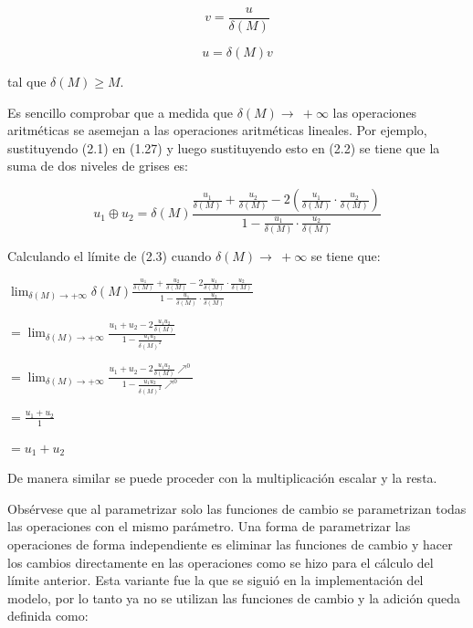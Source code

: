 \begin{equation}
	v=\frac{u}{\delta(M)}
\end{equation}

\begin{equation}
	u=\delta(M)v
\end{equation}

tal que $\delta(M) \geq M$.

Es sencillo comprobar que a medida que $\delta(M)\to\ +\infty$ las operaciones aritm\'eticas se asemejan a las operaciones aritm\'eticas lineales. Por ejemplo, sustituyendo (2.1) en (1.27) y luego sustituyendo esto en (2.2) se tiene que la suma de dos niveles de grises es:

\begin{equation}
	u_1\oplus u_2=\delta(M)\frac{\frac{u_1}{\delta(M)}+\frac{u_2}{\delta(M)}-2\left(\frac{u_1}{\delta(M)}\cdot\frac{u_2}{\delta(M)}\right)}{1-\frac{u_1}{\delta(M)}\cdot\frac{u_2}{\delta(M)}}
\end{equation}

Calculando el l\'imite de (2.3) cuando $\delta(M)\to\ +\infty$ se tiene que:

\begin{center}
	$\displaystyle\lim_{\delta(M) \to +\infty}\delta(M)\frac{\frac{u_1}{\delta(M)}+\frac{u_2}{\delta(M)}-2\frac{u_1}{\delta(M)}\cdot\frac{u_2}{\delta(M)}}{1-\frac{u_1}{\delta(M)}\cdot\frac{u_2}{\delta(M)}}$
	
	$\displaystyle=\lim_{\delta(M) \to +\infty}\frac{u_1+u_2-2\frac{u_1u_2}{\delta(M)}}{1-\frac{u_1u_2}{\delta(M)^2}}$
	
	$\displaystyle=\lim_{\delta(M) \to +\infty}\frac{u_1+u_2-2\frac{u_1u_2}{\delta(M)}\nearrow^0}{1-\frac{u_1u_2}{\delta(M)^2}\nearrow^0}$
	
	$\displaystyle=\frac{u_1+u_2}{1}$
	
	$\displaystyle=u_1+u_2$
\end{center}

De manera similar se puede proceder con la multiplicaci\'on escalar y la resta.

Obs\'ervese que al parametrizar solo las funciones de cambio se parametrizan todas las operaciones con el mismo par\'ametro. Una forma de parametrizar las operaciones de forma independiente es eliminar las funciones de cambio y hacer los cambios directamente en las operaciones como se hizo para el c\'alculo del l\'imite anterior. Esta variante fue la que se sigui\'o en la implementaci\'on del modelo, por lo tanto ya no se utilizan las funciones de cambio y la adici\'on queda definida como:

